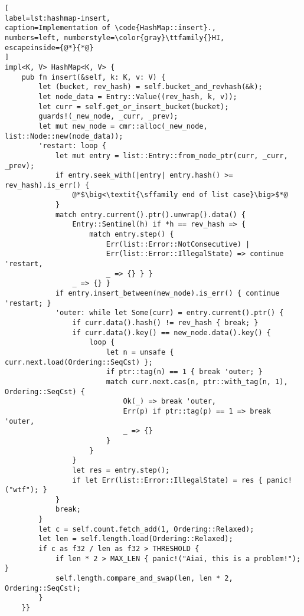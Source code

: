 \begin{lstlisting}[
label=lst:hashmap-insert,
caption=Implementation of \code{HashMap::insert}.,
numbers=left, numberstyle=\color{gray}\ttfamily{}HI,
escapeinside={@*}{*@}
]
impl<K, V> HashMap<K, V> {
    pub fn insert(&self, k: K, v: V) {
        let (bucket, rev_hash) = self.bucket_and_revhash(&k);
        let node_data = Entry::Value((rev_hash, k, v));
        let curr = self.get_or_insert_bucket(bucket);
        guards!(_new_node, _curr, _prev);
        let mut new_node = cmr::alloc(_new_node, list::Node::new(node_data));
        'restart: loop {
            let mut entry = list::Entry::from_node_ptr(curr, _curr, _prev);
            if entry.seek_with(|entry| entry.hash() >= rev_hash).is_err() {
                @*$\big<\textit{\sffamily end of list case}\big>$*@
            }
            match entry.current().ptr().unwrap().data() {
                Entry::Sentinel(h) if *h == rev_hash => {
                    match entry.step() {
                        Err(list::Error::NotConsecutive) |
                        Err(list::Error::IllegalState) => continue 'restart,
                        _ => {} } }
                _ => {} }
            if entry.insert_between(new_node).is_err() { continue 'restart; }
            'outer: while let Some(curr) = entry.current().ptr() {
                if curr.data().hash() != rev_hash { break; }
                if curr.data().key() == new_node.data().key() {
                    loop {
                        let n = unsafe { curr.next.load(Ordering::SeqCst) };
                        if ptr::tag(n) == 1 { break 'outer; }
                        match curr.next.cas(n, ptr::with_tag(n, 1), Ordering::SeqCst) {
                            Ok(_) => break 'outer,
                            Err(p) if ptr::tag(p) == 1 => break 'outer,
                            _ => {}
                        }
                    }
                }
                let res = entry.step();
                if let Err(list::Error::IllegalState) = res { panic!("wtf"); }
            }
            break;
        }
        let c = self.count.fetch_add(1, Ordering::Relaxed);
        let len = self.length.load(Ordering::Relaxed);
        if c as f32 / len as f32 > THRESHOLD {
            if len * 2 > MAX_LEN { panic!("Aiai, this is a problem!"); }
            self.length.compare_and_swap(len, len * 2, Ordering::SeqCst);
        }
    }}
\end{lstlisting}
